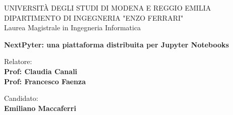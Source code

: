 \begin{titlepage}
\begin{figure}[!htb]
    \centering
\end{figure}
\vspace{30mm}
\begin{center}
    \LARGE{UNIVERSITÀ DEGLI STUDI DI MODENA E REGGIO EMILIA}
    \vspace{5mm}
    \\ \large{DIPARTIMENTO DI INGEGNERIA "ENZO FERRARI"}
    \vspace{5mm}
    \\ Laurea Magistrale in Ingegneria Informatica
\end{center}

\vspace{15mm}
\begin{center}
    {\LARGE{\bf NextPyter: una piattaforma distribuita per Jupyter Notebooks }}
    
    
\end{center}
\vspace{30mm}

\begin{minipage}[t]{0.47\textwidth}
	{\large{Relatore:}{\normalsize\vspace{3mm}
	\bf\\ \large{Prof: Claudia Canali} \normalsize\vspace{3mm}\bf \\ \large{Prof: Francesco Faenza}}}
\end{minipage}
\hfill
\begin{minipage}[t]{0.47\textwidth}\raggedleft
	{\large{Candidato:}{\normalsize\vspace{3mm} \bf\\ \large{Emiliano Maccaferri}}}
\end{minipage}

\vspace{30mm}
\hrulefill
\\

\end{titlepage}